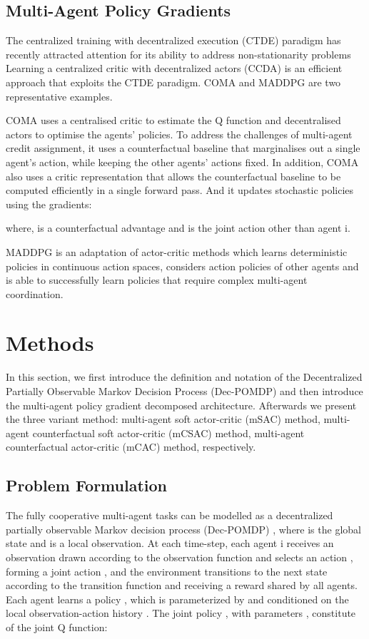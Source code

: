 \documentclass[runningheads]{llncs}
\begin{document}
\subsection{Multi-Agent Policy Gradients}
The centralized training with decentralized execution (CTDE)
paradigm has recently attracted attention for its ability
to address non-stationarity problems 
Learning a centralized
critic with decentralized actors (CCDA) is an efficient approach that exploits the CTDE paradigm.
COMA and MADDPG are two representative examples.

COMA uses a centralised critic to estimate the Q function
and decentralised actors to optimise the agents’ policies. To address the challenges of multi-agent credit assignment,
it uses a counterfactual baseline that marginalises
out a single agent’s action, while keeping the other agents’
actions fixed. In addition, COMA also uses a critic representation that allows
the counterfactual baseline to be computed efficiently in
a single forward pass. And it updates stochastic policies using the gradients:

where,   is a counterfactual advantage and  is the
joint action other than agent i.

MADDPG\cite{b10} is an adaptation of actor-critic methods which learns deterministic policies in continuous action spaces, considers action policies of other agents and is able to successfully learn policies that require complex multi-agent coordination.





\section{Methods}

In this section, we first introduce the definition and notation of the Decentralized Partially Observable Markov Decision Process (Dec-POMDP) and then introduce the multi-agent policy gradient decomposed architecture. Afterwards we present the three variant method: multi-agent soft actor-critic (mSAC) method, multi-agent counterfactual soft actor-critic (mCSAC) method, multi-agent counterfactual actor-critic (mCAC) method, respectively.
\subsection{Problem Formulation}
The fully cooperative multi-agent tasks can be modelled as a decentralized partially observable Markov decision process (Dec-POMDP) \cite{b12} , 
where  is the global state and 
 is a local observation.
At each time-step, each agent i
receives an observation  drawn according to the observation function 
 and selects an action , forming a joint action , and the environment transitions to the next state  according to the
transition function  and receiving a reward  shared by all agents. Each agent learns a
policy , which is parameterized by  and conditioned on the local observation-action history . The joint policy , with parameters , constitute of the joint Q function:
\end{document}
